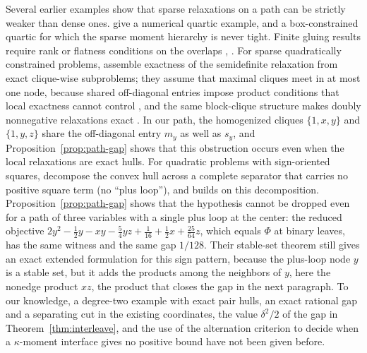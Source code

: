 Several earlier examples show that sparse relaxations on a path can be
strictly weaker than dense ones. \citet[Example~3.5]{NieDemmel2009} give a
numerical quartic example, and \citet[Example~6.7]{NieQuTangZhang2026} a
box-constrained quartic for which the sparse moment hierarchy is never
tight. Finite gluing results require rank or flatness conditions on the
overlaps \citep[Theorem~3.7]{Lasserre2006}, \citep{FantuzziFuentes2025}. For
sparse quadratically constrained problems, \citet{KojimaKimArima2026} assemble
exactness of the semidefinite relaxation from exact clique-wise subproblems;
they assume that maximal cliques meet in at most one node, because shared
off-diagonal entries impose product conditions that local exactness cannot
control \citep[Section~3.3]{KojimaKimArima2026}, and the same block-clique
structure makes doubly nonnegative relaxations exact
\citep{KimKojimaToh2020}. In our path, the homogenized cliques $\{1,x,y\}$ and
$\{1,y,z\}$ share the off-diagonal entry $m_y$ as well as $s_y$, and
Proposition~\ref{prop:path-gap} shows that this obstruction occurs even when
the local relaxations are exact hulls.
For quadratic problems with sign-oriented squares,
\citet[Corollary~1]{DeyKhajavirad2025} decompose the convex hull across a
complete separator that carries no positive square term (no ``plus loop''),
and \citet{Khajavirad2026} builds on this decomposition.
Proposition~\ref{prop:path-gap} shows that the hypothesis cannot be dropped
even for a path of three variables with a single plus loop at the center:
the reduced objective
$2y^2-\tfrac12y-xy-\tfrac54yz+\tfrac1{16}+\tfrac12x+\tfrac{25}{64}z$, which
equals $\Phi$ at binary leaves, has the same witness and the same gap $1/128$.
Their stable-set theorem \citep[Theorem~2 and Corollary~4]{DeyKhajavirad2025} still gives an
exact extended formulation for this sign pattern, because the plus-loop node
$y$ is a stable set, but it adds the products among the neighbors of $y$,
here the nonedge product $xz$, the product that closes the gap in the next paragraph. To our
knowledge, a degree-two example with exact pair hulls, an exact rational gap
and a separating cut in the existing coordinates, the value $\delta^2/2$ of
the gap in Theorem~\ref{thm:interleave}, and the use of the alternation
criterion to decide when a $\kappa$-moment interface gives no positive bound
have not been given before.

